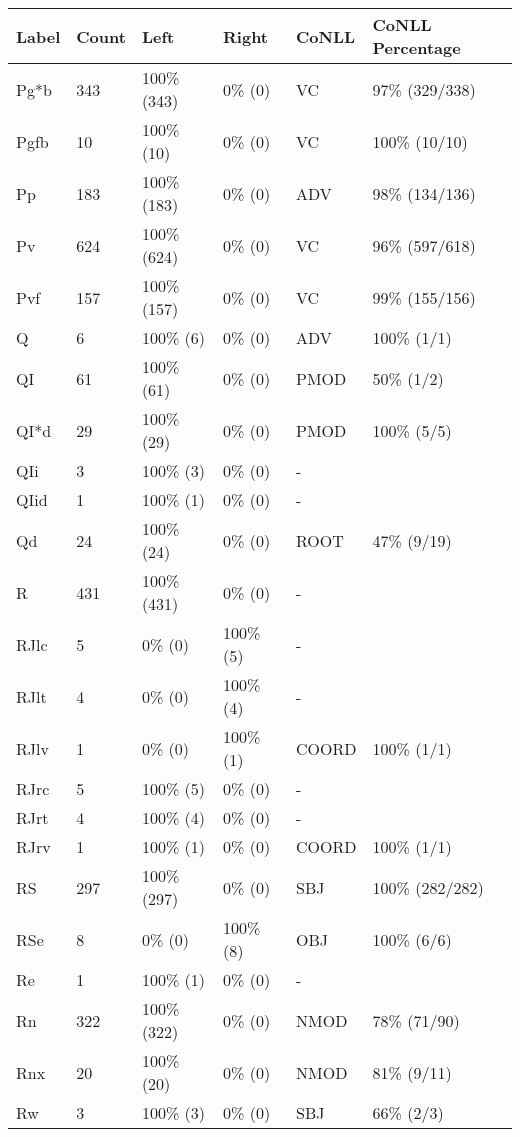 \begin{figure*}
\begin{tabular}{|l|l|l|l||l|l|}
\hline
Label & Count & Left & Right & CoNLL & CoNLL Percentage\\ 
\hline
 Pg*b & 343 & 100\% (343) & 0\% (0) & VC & 97\% (329/338) \\ 
\hline
 Pgfb & 10 & 100\% (10) & 0\% (0) & VC & 100\% (10/10) \\ 
\hline
 Pp & 183 & 100\% (183) & 0\% (0) & ADV & 98\% (134/136) \\ 
\hline
 Pv & 624 & 100\% (624) & 0\% (0) & VC & 96\% (597/618) \\ 
\hline
 Pvf & 157 & 100\% (157) & 0\% (0) & VC & 99\% (155/156) \\ 
\hline
 Q & 6 & 100\% (6) & 0\% (0) & ADV & 100\% (1/1) \\ 
\hline
 QI & 61 & 100\% (61) & 0\% (0) & PMOD & 50\% (1/2) \\ 
\hline
 QI*d & 29 & 100\% (29) & 0\% (0) & PMOD & 100\% (5/5) \\ 
\hline
 QIi & 3 & 100\% (3) & 0\% (0) & - &  \\ 
\hline
 QIid & 1 & 100\% (1) & 0\% (0) & - &  \\ 
\hline
 Qd & 24 & 100\% (24) & 0\% (0) & ROOT & 47\% (9/19) \\ 
\hline
 R & 431 & 100\% (431) & 0\% (0) & - &  \\ 
\hline
 RJlc & 5 & 0\% (0) & 100\% (5) & - &  \\ 
\hline
 RJlt & 4 & 0\% (0) & 100\% (4) & - &  \\ 
\hline
 RJlv & 1 & 0\% (0) & 100\% (1) & COORD & 100\% (1/1) \\ 
\hline
 RJrc & 5 & 100\% (5) & 0\% (0) & - &  \\ 
\hline
 RJrt & 4 & 100\% (4) & 0\% (0) & - &  \\ 
\hline
 RJrv & 1 & 100\% (1) & 0\% (0) & COORD & 100\% (1/1) \\ 
\hline
 RS & 297 & 100\% (297) & 0\% (0) & SBJ & 100\% (282/282) \\ 
\hline
 RSe & 8 & 0\% (0) & 100\% (8) & OBJ & 100\% (6/6) \\ 
\hline
 Re & 1 & 100\% (1) & 0\% (0) & - &  \\ 
\hline
 Rn & 322 & 100\% (322) & 0\% (0) & NMOD & 78\% (71/90) \\ 
\hline
 Rnx & 20 & 100\% (20) & 0\% (0) & NMOD & 81\% (9/11) \\ 
\hline
 Rw & 3 & 100\% (3) & 0\% (0) & SBJ & 66\% (2/3) \\ 

\end{tabular}
\end{figure*}
